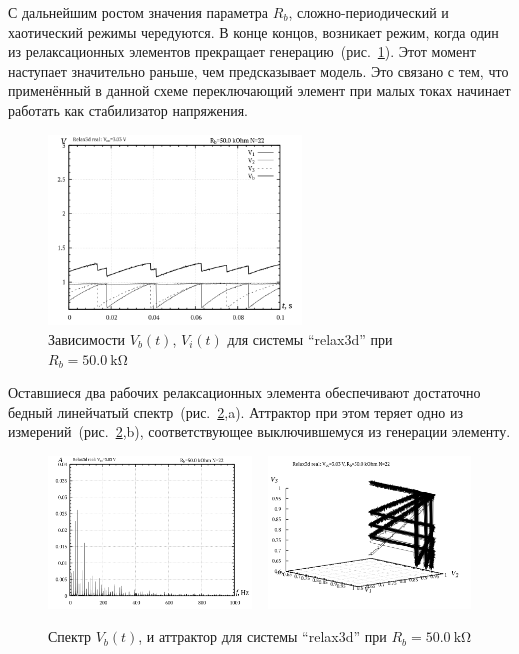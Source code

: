 С дальнейшим ростом значения параметра $R_b$, сложно-периодический и хаотический
режимы чередуются. В конце концов, возникает режим, когда
один из релаксационных элементов прекращает генерацию~(рис.~\ref{atu:f:relax3d_t_22}).
Этот момент наступает значительно раньше, чем предсказывает
модель. Это связано с тем, что применённый в данной схеме переключающий элемент
при малых токах начинает работать как стабилизатор напряжения.

\begin{figure}[htb!]
  \centerline{\includegraphics[width=0.6\textwidth]{p/relax3d_t_22.png} }
  \caption{Зависимости $V_b(t)$, $V_i(t)$ для системы ``relax3d'' при $R_b=\SI{50.0}{\kilo\ohm}$ }
  \label{atu:f:relax3d_t_22}
\end{figure}

Оставшиеся два рабочих релаксационных элемента обеспечивают
достаточно бедный линейчатый спектр~(рис.~\ref{atu:f:relax3d_f_22},a).
Аттрактор при этом теряет одно из измерений~(рис.~\ref{atu:f:relax3d_f_22},b),
соответствующее выключившемуся из генерации элементу.

\begin{figure}[htb!]
  \centerline{
    \includegraphics[width=0.48\textwidth]{p/relax3d_f_22.png}
    ~
    \includegraphics[width=0.48\textwidth]{p/relax3d_v1v2v3_22.png}
  }
  \caption{Спектр $V_b(t)$, и аттрактор для системы ``relax3d'' при $R_b=\SI{50.0}{\kilo\ohm}$ }
  \label{atu:f:relax3d_f_22}
\end{figure}

